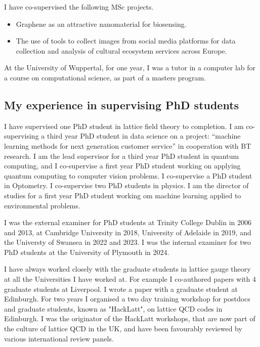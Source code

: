 \documentclass[12pt]{article}
\begin{document}
I have co-supervised the following MSc projects.

\begin{itemize}

\item  Graphene as an attractive nanomaterial for biosensing.

\item The use of tools to collect images from social media
platforms for data collection and analysis of cultural
ecosystem services across Europe.

\end{itemize}



At the University of Wuppertal, for one year, I was a tutor in
a computer lab for a course on computational 
science, as part of a masters program.


\subsection{My experience in supervising PhD students}

I have supervised one PhD student in lattice field theory to
completion. I am co-supervising a third year PhD student in data
science on a project: ``machine learning methods for next generation
customer service'' in cooperation with BT research. I am the lead
supervisor for a third year PhD student in quantum computing, and I
co-supervise a first year PhD student working on applying quantum
computing to computer vision problems.  I co-supervise a PhD student
in Optometry. I co-supervise two PhD students in physics.  I am the
director of studies for a first year PhD student working om machine
learning applied to environmental problems.

I was the external examiner for PhD students at Trinity College Dublin
in 2006 and 2013, at Cambridge University in 2018, University of
Adelaide in 2019, and the Universty of Swansea in 2022 and 2023.  I
was the internal examiner for two PhD students at the University of
Plymouth in 2024.

I have always worked closely with the graduate students in lattice
gauge theory at all the Universities I have worked at.  For example I
co-authored papers with 4 graduate students at Liverpool. I wrote a
paper with a graduate student at Edinburgh.  For two years I organised
a two day training workshop for postdocs and graduate students, known
as "HackLatt", on lattice QCD codes in Edinburgh. I was the originator
of the HackLatt workshops, that are now part of the culture of lattice
QCD in the UK, and have been favourably reviewed by various
international review panels.
\end{document}
